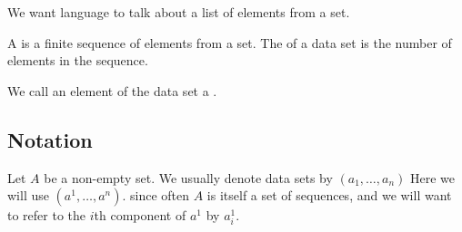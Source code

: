 
\sbasic








\sstart
{}


We want language to talk about
a list of elements from a set.


A  is a finite
sequence of elements from a set.
The  of a data set
is the number of elements in the
sequence.

We call an element of the
data set a .

\subsection{Notation}

Let $A$ be a non-empty set.
We usually denote data sets
by $(a_1, \dots, a_n)$
Here we will use
$(a^1, \dots, a^n)$.
since often $A$ is itself
a set of sequences,
and we will want to refer
to the $i$th component of
$a^1$ by $a^1_i$.


\strats

